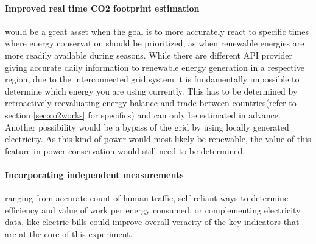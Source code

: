 \paragraph{Improved real time CO2 footprint estimation}would be a great asset when the goal is to more accurately react to specific times where energy conservation should be prioritized, as when renewable energies are more readily available during seasons. While there are different API provider giving accurate daily information to renewable energy generation \cite{co2_footprint_api} in a respective region, due to the interconnected grid system it is fundamentally impossible to determine which energy you are using currently. This has to be determined by retroactively reevaluating energy balance and trade between countries(refer to section \ref{sec:co2works} for specifics) and can only be estimated in advance. Another possibility would be a bypass of the grid by using locally generated electricity. As this kind of power would most likely be renewable, the value of this feature in power conservation would still need to be determined.

\pagebreak
\paragraph{Incorporating independent measurements}ranging from accurate count of human traffic, self reliant ways to determine efficiency and value of work per energy consumed, or complementing electricity data, like electric bills could improve overall veracity of the key indicators that are at the core of this experiment.

